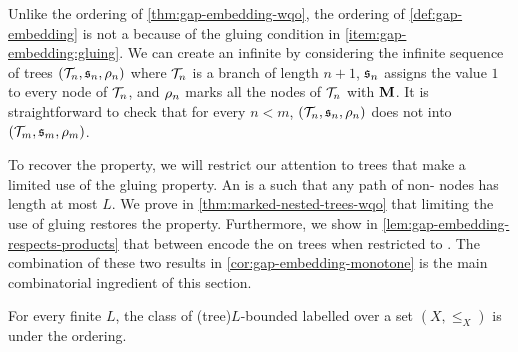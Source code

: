 \AP Unlike the  ordering of \cref{thm:gap-embedding-wqo}, the
 ordering of \cref{def:gap-embedding} is not a
 because of the gluing condition in
\cref{item:gap-embedding:gluing}. We can create an infinite  by
considering the infinite sequence of trees
$(\t_n, \spt_n, \marking_n)$ where $\t_n$ is a branch of length $n+1$,
$\mathfrak{s}_n$ assigns the value $1$ to every node of $\t_n$,
and $\rho_n$ marks all the nodes of $\t_n$ with $\mathbf{M}$.
It is straightforward to check that for every $n < m$,
$(\t_n, \spt_n, \marking_n)$ does not  into
$(\t_m, \spt_m, \marking_m)$.

\AP To recover the  property, we will restrict our
attention to trees that make a limited use of the gluing property. An
 is a  such that any
path of non- nodes has length at most $L$. We prove in
\cref{thm:marked-nested-trees-wqo} that limiting the use of gluing restores the
 property. Furthermore, we show in
\cref{lem:gap-embedding-respects-products} that  between
 encode the  on trees
when restricted to . The combination of these two results in
\cref{cor:gap-embedding-monotone} is the main combinatorial ingredient of this
section.

\begin{theorem}[name={},restate={thm:marked-nested-trees-wqo}]
  \label{thm:marked-nested-trees-wqo}
  For every finite $L$,
  the class of \kl(tree){$L$-bounded}  labelled over a
   set $(X, \leq_X)$
  is  under the  ordering.
\end{theorem}


